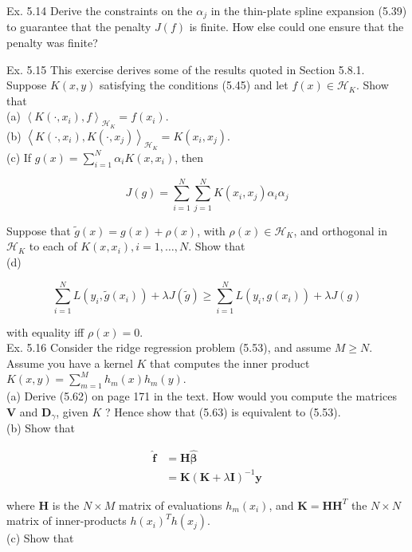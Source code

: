 \documentclass[10pt]{article}
\begin{document}
Ex. 5.14 Derive the constraints on the $\alpha_{j}$ in the thin-plate spline expansion (5.39) to guarantee that the penalty $J(f)$ is finite. How else could one ensure that the penalty was finite?

Ex. 5.15 This exercise derives some of the results quoted in Section 5.8.1. Suppose $K(x, y)$ satisfying the conditions (5.45) and let $f(x) \in \mathcal{H}_{K}$. Show that\\
(a) $\left\langle K\left(\cdot, x_{i}\right), f\right\rangle_{\mathcal{H}_{K}}=f\left(x_{i}\right)$.\\
(b) $\left\langle K\left(\cdot, x_{i}\right), K\left(\cdot, x_{j}\right)\right\rangle_{\mathcal{H}_{K}}=K\left(x_{i}, x_{j}\right)$.\\
(c) If $g(x)=\sum_{i=1}^{N} \alpha_{i} K\left(x, x_{i}\right)$, then

$$
J(g)=\sum_{i=1}^{N} \sum_{j=1}^{N} K\left(x_{i}, x_{j}\right) \alpha_{i} \alpha_{j}
$$

Suppose that $\tilde{g}(x)=g(x)+\rho(x)$, with $\rho(x) \in \mathcal{H}_{K}$, and orthogonal in $\mathcal{H}_{K}$ to each of $K\left(x, x_{i}\right), i=1, \ldots, N$. Show that\\
(d)


\begin{equation*}
\sum_{i=1}^{N} L\left(y_{i}, \tilde{g}\left(x_{i}\right)\right)+\lambda J(\tilde{g}) \geq \sum_{i=1}^{N} L\left(y_{i}, g\left(x_{i}\right)\right)+\lambda J(g) \tag{5.74}
\end{equation*}


with equality iff $\rho(x)=0$.\\
Ex. 5.16 Consider the ridge regression problem (5.53), and assume $M \geq N$. Assume you have a kernel $K$ that computes the inner product $K(x, y)= \sum_{m=1}^{M} h_{m}(x) h_{m}(y)$.\\
(a) Derive (5.62) on page 171 in the text. How would you compute the matrices $\mathbf{V}$ and $\mathbf{D}_{\gamma}$, given $K$ ? Hence show that (5.63) is equivalent to (5.53).\\
(b) Show that


\begin{align*}
\hat{\mathbf{f}} & =\mathbf{H} \hat{\boldsymbol{\beta}} \\
& =\mathbf{K}(\mathbf{K}+\lambda \mathbf{I})^{-1} \mathbf{y} \tag{5.75}
\end{align*}


where $\mathbf{H}$ is the $N \times M$ matrix of evaluations $h_{m}\left(x_{i}\right)$, and $\mathbf{K}=\mathbf{H H}^{T}$ the $N \times N$ matrix of inner-products $h\left(x_{i}\right)^{T} h\left(x_{j}\right)$.\\
(c) Show that
\end{document}
